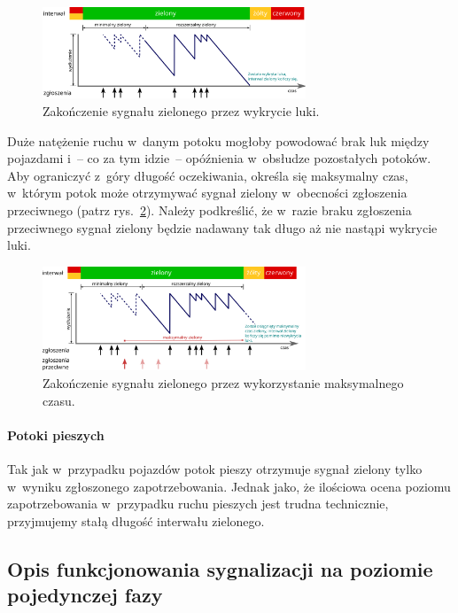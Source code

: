 \documentclass{pracamgr}
\newcommand{\imgr}[1]{rys.~\ref{#1}}
\theoremstyle{plain}
\begin{document}
\begin{figure}[h] \centering
  \includegraphics[width=0.7\textwidth]{img/signals-gap-out}
  \caption{Zakończenie sygnału zielonego przez wykrycie luki.}
\label{img:gap-out}
\end{figure}

Duże natężenie ruchu w~danym potoku mogłoby powodować brak luk między
pojazdami i~-- co za tym idzie~-- opóźnienia w~obsłudze
pozostałych potoków. Aby ograniczyć z~góry długość oczekiwania, określa
się maksymalny czas, w~którym potok może otrzymywać sygnał zielony
w~obecności zgłoszenia przeciwnego (patrz \imgr{img:max-out}). Należy
podkreślić, że w~razie braku zgłoszenia przeciwnego sygnał zielony
będzie nadawany tak długo aż nie nastąpi wykrycie luki.
\begin{figure}[h] \centering
  \includegraphics[width=0.7\textwidth]{img/signals-max-out}
  \caption{Zakończenie sygnału zielonego przez wykorzystanie
maksymalnego czasu.}
\label{img:max-out}
\end{figure}

\paragraph{Potoki pieszych} Tak jak w~przypadku pojazdów potok pieszy
otrzymuje sygnał zielony tylko w~wyniku zgłoszonego
zapotrzebowania. Jednak jako, że ilościowa ocena poziomu
zapotrzebowania w~przypadku ruchu pieszych jest trudna technicznie,
przyjmujemy stałą długość interwału zielonego.

\subsection{Opis funkcjonowania sygnalizacji na poziomie pojedynczej
fazy}
\end{document}
